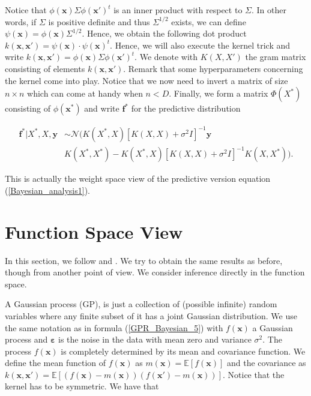 \documentclass[12pt,a4paper,oneside]{book}
\begin{document}
Notice that $\phi\left(\bm{x}\right) \Sigma \phi \left(\bm{x}'\right)^t$ is an inner product with respect to $\Sigma$. In other words, if $\Sigma$ is positive definite and thus $\Sigma^{1/2}$ exists, we can define $\psi(\bm{x}) = \phi\left(\bm{x}\right) \Sigma^{1/2} $. Hence, we obtain the following dot product $k(\bm{x},\bm{x}') = \psi(\bm{x}) \cdot \psi(\bm{x})^t$. Hence, we will also execute the kernel trick and write $k(\bm{x},\bm{x}') = \phi\left(\bm{x}\right) \Sigma \phi \left(\bm{x}'\right)^t$. We denote with $K(X,X')$ the gram matrix consisting of elements $k(\bm{x},\bm{x}')$. Remark that some hyperparameters concerning the kernel come into play. Notice that we now need to invert a matrix of size $n \times n$ which can come at handy when $n < D$. Finally, we form a matrix $\Phi(X^{\ast})$ consisting of $\phi(\bm{x}^{\ast})$ and write $\bm{f^{\ast}}$ for the predictive distribution 

\begin{equation}\label{GPR_Bayesian_3}
\boxed{\begin{aligned}
\bm{f^{\ast}} | X^{\ast}, X, \bm{y} &\sim \mathcal{N} (   K(X^{\ast},X)[K(X,X) + \sigma^2 I]^{-1} \bm{y} \\  
& K(X^{\ast}, X^{\ast}) - K(X^{\ast},X)  [K(X,X) + \sigma^2 I]^{-1}  K(X,X^{\ast} )).
\end{aligned}}
\end{equation}

This is actually the weight space view of the predictive version equation (\ref{Bayesian_analysis1}).


\section{Function Space View} \label{functionspace}

In this section, we follow \cite{GPRbook} and \cite{de2018machine}. We try to obtain the same results as before, though from another point of view. We consider inference directly in the function space. 

A Gaussian process (GP), is just a collection of (possible infinite) random variables where any finite subset of it has a joint Gaussian distribution. We use the same notation as in formula (\ref{GPR_Bayesian_5}) with $f(\bm{x})$ a Gaussian process and $\bm{\varepsilon}$ is the noise in the data with mean zero and variance $\sigma^2$. The process $f(\bm{x})$ is completely determined by its mean and covariance function. We define the mean function of $f(\bm{x})$ as  $m(\bm{x}) = \mathbb{E}[f(\bm{x})]$ and the covariance as $k(\bm{x},\bm{x}') = \mathbb{E}[(f(\bm{x}) - m(\bm{x}))(f(\bm{x}') - m(\bm{x}))]$. Notice that the kernel has to be symmetric. We have that 
\end{document}
